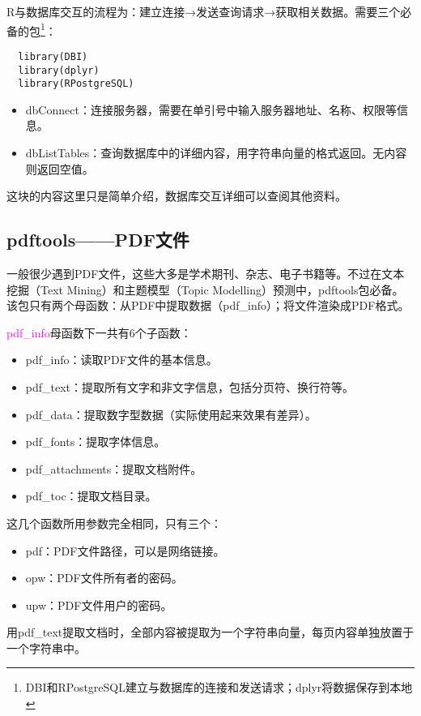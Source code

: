 \documentclass[cn,hazy,blue,14pt,screen]{elegantnote}
\begin{document}
R与数据库交互的流程为：建立连接→发送查询请求→获取相关数据。需要三个必备的包\footnote{DBI和RPostgreSQL建立与数据库的连接和发送请求；dplyr将数据保存到本地}：

\begin{lstlisting}
  library(DBI)
  library(dplyr)
  library(RPostgreSQL)
\end{lstlisting}

\begin{itemize}
  \item dbConnect：连接服务器，需要在单引号中输入服务器地址、名称、权限等信息。
  \item dbListTables：查询数据库中的详细内容，用字符串向量的格式返回。无内容则返回空值。
\end{itemize}

这块的内容这里只是简单介绍，数据库交互详细可以查阅其他资料。

\subsection{pdftools——PDF文件}
一般很少遇到PDF文件，这些大多是学术期刊、杂志、电子书籍等。不过在文本挖掘（Text Mining）和主题模型（Topic Modelling）预测中，pdftools包必备。该包只有两个母函数：从PDF中提取数据（pdf\_info）；将文件渲染成PDF格式。

\textcolor{magenta}{pdf\_info}母函数下一共有6个子函数：

\begin{itemize}
  \item pdf\_info：读取PDF文件的基本信息。
  \item pdf\_text：提取所有文字和非文字信息，包括分页符、换行符等。
  \item pdf\_data：提取数字型数据（实际使用起来效果有差异）。
  \item pdf\_fonts：提取字体信息。
  \item pdf\_attachments：提取文档附件。
  \item pdf\_toc：提取文档目录。
\end{itemize}

这几个函数所用参数完全相同，只有三个：

\begin{itemize}
  \item pdf：PDF文件路径，可以是网络链接。
  \item opw：PDF文件所有者的密码。
  \item upw：PDF文件用户的密码。
\end{itemize}

用pdf\_text提取文档时，全部内容被提取为一个字符串向量，每页内容单独放置于一个字符串中。
\end{document}
